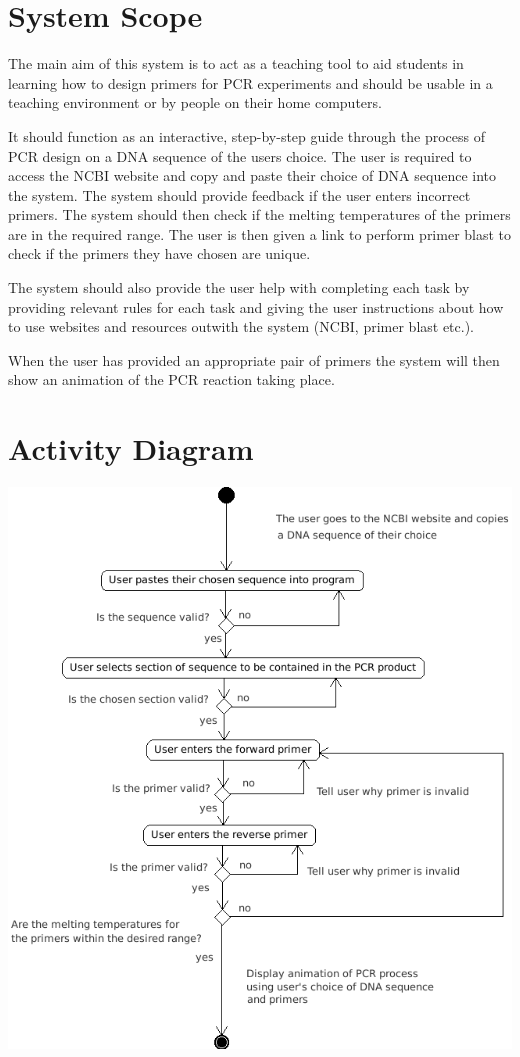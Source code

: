 \documentclass{l3deliverable}
\begin{document}

\section{System Scope}

The main aim of this system is to act as a teaching tool to aid students
in learning how to design primers for PCR experiments and should be
usable in a teaching environment or by people on their home computers.

It should function as an interactive, step-by-step guide through the
process of PCR design on a DNA sequence of the users choice.
The user is required to access the NCBI website and copy and paste
their choice of DNA sequence into the system.
The system should provide feedback if the user enters incorrect
primers. 
The system should then check if the melting temperatures of the
primers are in the required range.
The user is then given a link to perform primer blast to check if the
primers they have chosen are unique.

The system should also provide the user help with completing each task
by providing relevant rules for each task and giving the user
instructions about how to use websites and resources outwith the system
(NCBI, primer blast etc.).

When the user has provided an appropriate pair of primers the system
will then show an animation of the PCR reaction taking place.

\section{Activity Diagram}

\includegraphics{PCRActivity.png}
\end{document}

